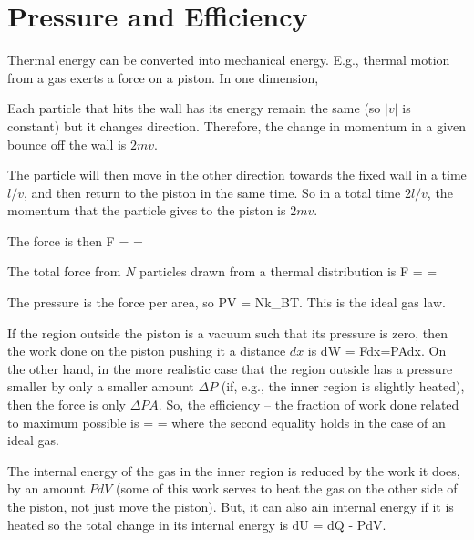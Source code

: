 \documentclass[11pt]{book}
\begin{document}
\section{Pressure and Efficiency}

Thermal energy can be converted into mechanical energy.  E.g., thermal motion from a gas exerts a force on a piston. In one dimension,
\bei
\item Each particle that hits the wall has its energy remain the same (so $|v|$ is constant) but it changes direction. Therefore, the change in momentum in a given bounce off the wall is $2mv$. 
\item The particle will then move in the other direction towards the fixed wall in a time $l/v$, and then return to the piston in the same time. So in a total time $2l/v$, the momentum that the particle gives to the piston is $2mv$. 
\item The force is then 
\be F =  = 
\ee
\item The total force from $N$ particles drawn from a thermal distribution is
\be
F =  = 
\ee
\item The pressure is the force per area, so
\be
PV = Nk_BT.
\ee
\eei
This is the ideal gas law.


If the region outside the piston is a vacuum such that its pressure is zero, then the work done on the piston pushing it a distance $dx$ is
\be
dW = Fdx=PAdx.\ee
On the other hand, in the more realistic case that the region outside has a pressure smaller by only a smaller amount $\Delta P$ (if, e.g., the inner region is slightly heated), then the force is only $\Delta P A$. So, the efficiency -- the fraction of work done related to maximum possible is
\be
\eta =  = 
\ee
where the second equality holds in the case of an ideal gas.

The internal energy of the gas in the inner region is reduced by the work it does, by an amount $PdV$ (some of this work serves to heat the gas on the other side of the piston, not just move the piston). But, it can also ain internal energy if it is heated so the total change in its internal energy is
\be
dU = dQ - PdV.\ee
\end{document}
